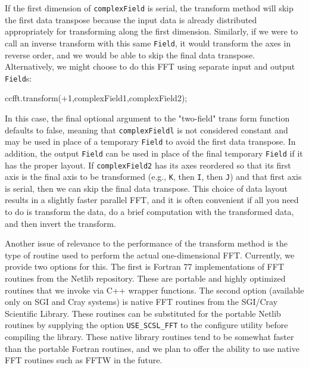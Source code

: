 If the first dimension of \texttt{complexField} is serial, the transform method will skip the first data transpose because the input data is already distributed appropriately for transforming along the first dimension. Similarly, if we were to call an inverse transform with this same \texttt{Field}, it would transform the axes in reverse order, and we would be able to skip the final data transpose. Alternatively, we might choose to do this FFT using separate input and output \texttt{Field}s:
\begin{smallcode}
ccfft.transform(+1,complexField1,complexField2);
\end{smallcode}
In this case, the final optional argument to the "two-field" trans form function defaults to false, meaning that \texttt{complexFieldl} is not considered constant and may be used in place of a temporary \texttt{Field} to avoid the first data transpose. In addition, the output \texttt{Field} can be used in place of the final temporary \texttt{Field} if it has the proper layout. If \texttt{complexField2} has its axes reordered so that its first axis is the final axis to be transformed
(e.g., \texttt{K}, then \texttt{I}, then \texttt{J}) and that first axis is serial, then we can skip the final data transpose. This choice of data layout results in a slightly faster parallel FFT, and it is often convenient if all you need to do is transform the data, do a brief computation with the transformed data, and then invert the transform.

Another issue of relevance to the performance of the transform method is the type of routine used to perform the actual one-dimensional FFT. Currently, we provide two options for this. The first is Fortran 77 implementations of FFT routines from the Netlib repository. These are portable and highly optimized routines that we invoke via C++ wrapper functions. The second option (available only on SGI and Cray systems) is native FFT routines from the SGI/Cray Scientific Library. These routines can be substituted for the portable Netlib routines by supplying the option {\tt USE\_SCSL\_FFT} to the configure utility before compiling the \ippl library. These native library routines tend to be somewhat faster than the portable Fortran routines, and we plan to offer the ability to use native FFT routines such as FFTW in the future.
